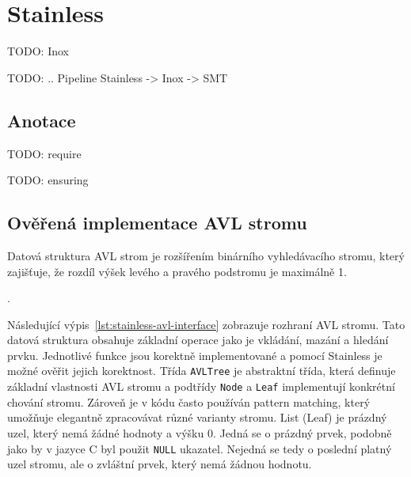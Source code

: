 \chapter{Stainless}
\label{ch:stainless}


TODO: Inox

TODO: .. Pipeline Stainless -> Inox -> SMT

\section{Anotace}
\label{sec:stainless-annotations}

TODO: require

TODO: ensuring

\section{Ověřená implementace AVL stromu}
\label{sec:stainless-avl}

Datová struktura AVL strom je rozšířením binárního vyhledávacího stromu,
který zajišťuje, že rozdíl výšek levého a pravého podstromu je maximálně 1.

\cite{Pruvodce22}.

Následující výpis~\ref{lst:stainless-avl-interface} zobrazuje rozhraní AVL stromu.
Tato datová struktura obsahuje základní operace jako je vkládání, mazání a hledání prvku.
Jednotlivé funkce jsou korektně implementované a pomocí Stainless je možné ověřit jejich korektnost.
Třída \texttt{AVLTree} je abstraktní třída, která definuje základní vlastnosti AVL stromu
a podtřídy \texttt{Node} a \texttt{Leaf} implementují konkrétní chování stromu.
Zároveň je v kódu často používán pattern matching,
který umožňuje elegantně zpracovávat různé varianty stromu.
List (Leaf) je prázdný uzel, který nemá žádné hodnoty a výšku 0.
Jedná se o prázdný prvek, podobně jako by v jazyce C byl použit \texttt{NULL} ukazatel.
Nejedná se tedy o poslední platný uzel stromu, ale o zvláštní prvek, který nemá žádnou hodnotu.


